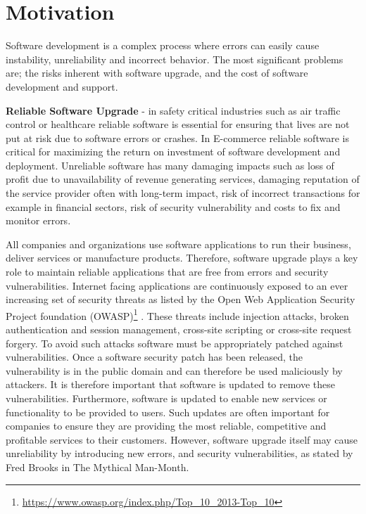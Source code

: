 \documentclass[a4paper,11pt,twoside]{report}
\begin{document}
\section{Motivation}
Software development is a complex process where errors can easily cause instability, unreliability and incorrect behavior. The most significant problems are; the risks inherent with software upgrade, and the cost of software development and support. 
 
\setlength{\leftskip}{0.5cm}
\setlength{\rightskip}{0.5cm}
\noindent \textbf{Reliable Software Upgrade} - in safety critical industries such as air traffic control or healthcare reliable software is essential for ensuring that lives are not put at risk due to software errors or crashes. In E-commerce reliable software is critical for maximizing the return on investment of software development and deployment. Unreliable software has many damaging impacts such as loss of profit due to unavailability of revenue generating services, damaging reputation of the service provider often with long-term impact, risk of incorrect transactions for example in financial sectors, risk of security vulnerability and costs to fix and monitor errors.

All companies and organizations use software applications to run their business, deliver services or manufacture products. Therefore, software upgrade plays a key role to maintain reliable applications that are free from errors and security vulnerabilities.   Internet facing applications are continuously exposed to an ever increasing set of security threats as listed by the Open Web Application Security Project foundation (OWASP)\footnote{\url{https://www.owasp.org/index.php/Top_10_2013-Top_10}} . These threats include injection attacks, broken authentication and session management, cross-site scripting or cross-site request forgery. To avoid such attacks software must be appropriately patched against vulnerabilities. Once a software security patch has been released, the vulnerability is in the public domain and can therefore be used maliciously by attackers. It is therefore important that software is updated to remove these vulnerabilities.  Furthermore, software is updated to enable new services or functionality to be provided to users. Such updates are often important for companies to ensure they are providing the most reliable, competitive and profitable services to their customers. However, software upgrade itself may cause unreliability by introducing new errors, and security vulnerabilities, as stated by Fred Brooks in The Mythical Man-Month. 
\end{document}
